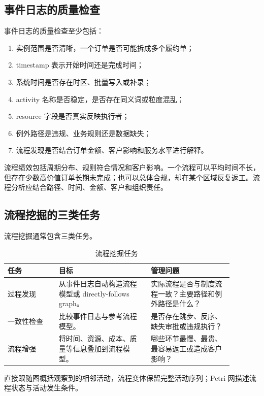 \subsection{事件日志的质量检查}

事件日志的质量检查至少包括：
\begin{enumerate}
  \item 实例范围是否清晰，一个订单是否可能拆成多个履约单；
  \item timestamp 表示开始时间还是完成时间；
  \item 系统时间是否存在时区、批量写入或补录；
  \item activity 名称是否稳定，是否存在同义词或粒度混乱；
  \item resource 字段是否真实反映执行者；
  \item 例外路径是违规、业务规则还是数据缺失；
  \item 流程发现是否结合订单金额、客户影响和服务水平进行解释。
\end{enumerate}

流程绩效包括周期分布、规则符合情况和客户影响。一个流程可以平均时间不长，但存在少数高价值订单长期未完成；也可以总体合规，却在某个区域反复返工。流程分析应结合路径、时间、金额、客户和组织责任。

\subsection{流程挖掘的三类任务}

流程挖掘通常包含三类任务。

\begin{table}[htbp]
\centering
\caption{流程挖掘任务}
\begin{tabular}{P{0.20\linewidth}P{0.36\linewidth}P{0.32\linewidth}}
\toprule
{}
任务 & 目标 & 管理问题\\
\midrule

过程发现 & 从事件日志自动构造流程模型或 directly-follows graph。 & 实际流程是否与制度流程一致？主要路径和例外路径是什么？\\
一致性检查 & 比较事件日志与参考流程模型。 & 是否存在跳步、反序、缺失审批或违规执行？\\
流程增强 & 将时间、资源、成本、质量等信息叠加到流程模型。 & 哪些环节最慢、最贵、最容易返工或造成客户影响？\\
\bottomrule
\end{tabular}
\end{table}

直接跟随图概括观察到的相邻活动，流程变体保留完整活动序列；Petri 网描述流程状态与活动发生条件。

